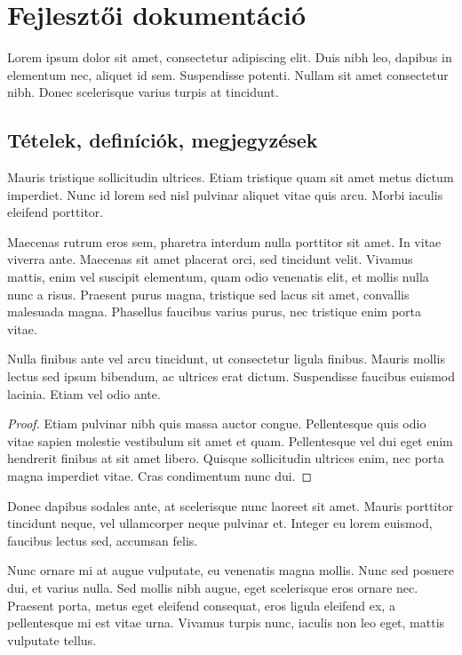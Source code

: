 \chapter{Fejlesztői dokumentáció}
\label{ch:impl}

Lorem ipsum dolor sit amet, consectetur adipiscing elit. Duis nibh leo, dapibus in elementum nec, aliquet id sem. Suspendisse potenti. Nullam sit amet consectetur nibh. Donec scelerisque varius turpis at tincidunt.


\section{Tételek, definíciók, megjegyzések}

\begin{definition}
Mauris tristique sollicitudin ultrices. Etiam tristique quam sit amet metus dictum imperdiet. Nunc id lorem sed nisl pulvinar aliquet vitae quis arcu. Morbi iaculis eleifend porttitor.
\end{definition}

Maecenas rutrum eros sem, pharetra interdum nulla porttitor sit amet. In vitae viverra ante. Maecenas sit amet placerat orci, sed tincidunt velit. Vivamus mattis, enim vel suscipit elementum, quam odio venenatis elit, et mollis nulla nunc a risus. Praesent purus magna, tristique sed lacus sit amet, convallis malesuada magna. Phasellus faucibus varius purus, nec tristique enim porta vitae.

\begin{theorem}
Nulla finibus ante vel arcu tincidunt, ut consectetur ligula finibus. Mauris mollis lectus sed ipsum bibendum, ac ultrices erat dictum. Suspendisse faucibus euismod lacinia. Etiam vel odio ante.
\end{theorem}
\begin{proof}
Etiam pulvinar nibh quis massa auctor congue. Pellentesque quis odio vitae sapien molestie vestibulum sit amet et quam. Pellentesque vel dui eget enim hendrerit finibus at sit amet libero. Quisque sollicitudin ultrices enim, nec porta magna imperdiet vitae. Cras condimentum nunc dui.
\end{proof}

Donec dapibus sodales ante, at scelerisque nunc laoreet sit amet. Mauris porttitor tincidunt neque, vel ullamcorper neque pulvinar et. Integer eu lorem euismod, faucibus lectus sed, accumsan felis. 

\begin{remark}
Nunc ornare mi at augue vulputate, eu venenatis magna mollis. Nunc sed posuere dui, et varius nulla. Sed mollis nibh augue, eget scelerisque eros ornare nec. Praesent porta, metus eget eleifend consequat, eros ligula eleifend ex, a pellentesque mi est vitae urna. Vivamus turpis nunc, iaculis non leo eget, mattis vulputate tellus.
\end{remark}

